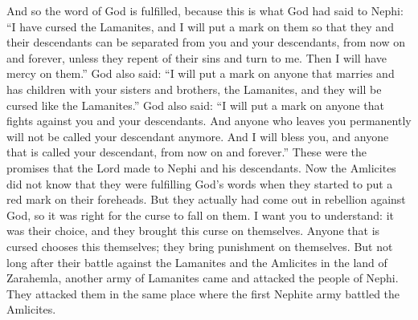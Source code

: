 And so the word of God is fulfilled, because this is what God had said to Nephi: ``I have cursed the Lamanites, and I will put a mark on them so that they and their descendants can be separated from you and your descendants, from now on and forever, unless they repent of their sins and turn to me. Then I will have mercy on them.''
\bverse \iffalse And again: I will set a mark upon him that mingleth his seed with thy brethren, that they may be cursed also. \fi
God also said: ``I will put a  mark on anyone that marries and has children with your sisters and brothers, the Lamanites, and they will be cursed like the Lamanites.''
\bverse \iffalse And again: I will set a mark upon him that fighteth against thee and thy seed. \fi
God also said: ``I will put a mark on anyone that fights against you and your descendants.
\bverse \iffalse And again, I say he that departeth from thee shall no more be called thy seed; and I will bless thee, and whomsoever shall be called thy seed, henceforth and forever; and these were the promises of the Lord unto Nephi and to his seed. \fi
And anyone who leaves you permanently will not be called your descendant anymore. And I will bless you, and anyone that is called your descendant, from now on and forever.'' These were the promises that the Lord made to Nephi and his descendants.
\bverse \iffalse Now the Amlicites knew not that they were fulfilling the words of God when they began to mark themselves in their foreheads; nevertheless they had come out in open rebellion against God; therefore it was expedient that the curse should fall upon them. \fi
Now the Amlicites did not know that they were fulfilling God's words when they started to put a red mark on their foreheads. But they actually had come out in rebellion against God, so it was right for the curse to fall on them.
\bverse \iffalse Now I would that ye should see that they brought upon themselves the curse; and even so doth every man that is cursed bring upon himself his own condemnation. \fi
I want you to understand: it was their choice, and they brought this curse on themselves. Anyone that is cursed chooses this themselves; they bring punishment on themselves.
\bverse \iffalse Now it came to pass that not many days after the battle which was fought in the land of Zarahemla, by the Lamanites and the Amlicites, that there was another army of the Lamanites came in upon the people of Nephi, in the same place where the first army met the Amlicites. \fi
But not long after their battle against the Lamanites and the Amlicites in the land of Zarahemla, another army of Lamanites came and attacked the people of Nephi. They attacked them in the same place where the first Nephite army battled the Amlicites.
